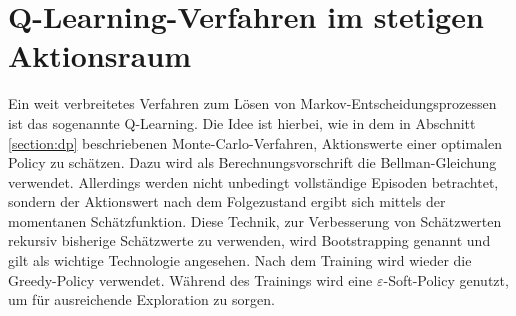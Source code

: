 \section{Q-Learning-Verfahren im stetigen Aktionsraum}
\label{section:qlearning}
Ein weit verbreitetes Verfahren zum Lösen von Markov-Entscheidungsprozessen ist das sogenannte Q-Learning.
Die Idee ist hierbei, wie in dem in Abschnitt \ref{section:dp} beschriebenen Monte-Carlo-Verfahren, Aktionswerte einer optimalen Policy zu schätzen.
Dazu wird als Berechnungsvorschrift die Bellman-Gleichung verwendet.
Allerdings werden nicht unbedingt vollständige Episoden betrachtet, sondern der Aktionswert nach dem Folgezustand ergibt sich mittels der momentanen Schätzfunktion.
Diese Technik, zur Verbesserung von Schätzwerten rekursiv bisherige Schätzwerte zu verwenden, wird Bootstrapping genannt und gilt als wichtige Technologie angesehen. \cite{Sutton1998}
Nach dem Training wird wieder die Greedy-Policy verwendet.
Während des Trainings wird eine $\varepsilon$-Soft-Policy genutzt, um für ausreichende Exploration zu sorgen.

